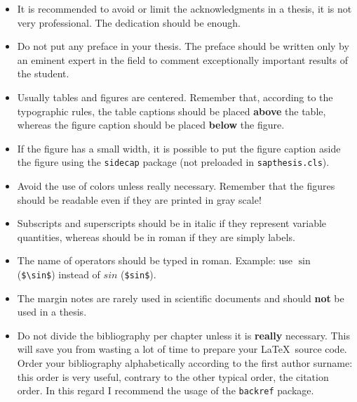 \documentclass[a5paper,11pt]{article}
\newcommand{\bs}{\textbackslash}
\begin{document}
\begin{itemize}
\item It is recommended to avoid or limit the acknowledgments in a thesis, it 
is not very professional. The dedication should be enough.

\item Do not put any preface in your thesis. The preface should be written only by an eminent expert in the field to comment exceptionally important results of the student.

\item Usually tables and figures are centered. Remember that, according to the typographic rules, the table captions should be placed \textbf{above} the table, whereas the figure caption should be placed \textbf{below} the figure.

\item If the figure has a small width, it is possible to put the figure caption
aside the figure using the \texttt{sidecap} package (not preloaded in \texttt{sapthesis.cls}).

\item Avoid the use of colors unless really necessary. Remember that the figures should be readable even if they are printed in gray scale!

\item Subscripts and superscripts should be in italic if they represent variable quantities, whereas should be in roman if they are simply labels.

\item The name of operators should be typed in roman. Example: use $\sin$ (\texttt{\$\bs sin\$}) instead of $sin$ (\texttt{\$sin\$}).

\item The margin notes are rarely used in scientific documents and should \textbf{not} be used in a thesis.

\item Do not divide the bibliography per chapter unless it is \textbf{really} necessary.
This will save you from wasting a lot of time to prepare your \LaTeX\ source code.
Order your bibliography alphabetically according to the
first author surname: this order is very useful, contrary to the other typical order, the citation order. In this regard
I recommend the usage of the \texttt{backref} package.

\end{itemize}
\end{document}
